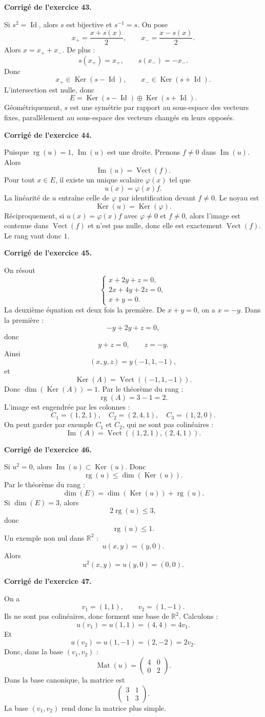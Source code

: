 \documentclass[11pt,a4paper]{article}
\newcommand{\corr}[1]{
    \vspace{0.4cm}
    \noindent\textbf{\textcolor{blue!60!black}{Corrigé de l'exercice #1.}}
    \par\vspace{0.1cm}
}
\newcommand{\Ker}{\operatorname{Ker}}
\newcommand{\Img}{\operatorname{Im}}
\newcommand{\rg}{\operatorname{rg}}
\newcommand{\Mat}{\operatorname{Mat}}
\newcommand{\Vect}{\operatorname{Vect}}
\newcommand{\Id}{\operatorname{Id}}
\begin{document}
\corr{43}
Si $s^2=\Id$, alors $s$ est bijective et $s^{-1}=s$. On pose
\[
x_+=\frac{x+s(x)}2,\qquad x_-=\frac{x-s(x)}2.
\]
Alors $x=x_++x_-$. De plus :
\[
s(x_+)=x_+,
\qquad
s(x_-)=-x_-.
\]
Donc
\[
x_+\in\Ker(s-\Id),
\qquad
x_-\in\Ker(s+\Id).
\]
L'intersection est nulle, donc
\[
E=\Ker(s-\Id)\oplus\Ker(s+\Id).
\]
Géométriquement, $s$ est une symétrie par rapport au sous-espace des vecteurs fixes, parallèlement au sous-espace des vecteurs changés en leurs opposés.

\corr{44}
Puisque $\rg(u)=1$, $\Img(u)$ est une droite. Prenons $f\neq0$ dans $\Img(u)$. Alors
\[
\Img(u)=\Vect(f).
\]
Pour tout $x\in E$, il existe un unique scalaire $\varphi(x)$ tel que
\[
u(x)=\varphi(x)f.
\]
La linéarité de $u$ entraîne celle de $\varphi$ par identification devant $f\neq0$. Le noyau est
\[
\Ker(u)=\Ker(\varphi).
\]
Réciproquement, si $u(x)=\varphi(x)f$ avec $\varphi\neq0$ et $f\neq0$, alors l'image est contenue dans $\Vect(f)$ et n'est pas nulle, donc elle est exactement $\Vect(f)$. Le rang vaut donc $1$.

\corr{45}
On résout
\[
\begin{cases}
x+2y+z=0,\\
2x+4y+2z=0,\\
x+y=0.
\end{cases}
\]
La deuxième équation est deux fois la première. De $x+y=0$, on a $x=-y$. Dans la première :
\[
-y+2y+z=0,
\]
donc
\[
y+z=0,
\qquad z=-y.
\]
Ainsi
\[
(x,y,z)=y(-1,1,-1),
\]
et
\[
\Ker(A)=\Vect((-1,1,-1)).
\]
Donc $\dim(\Ker(A))=1$. Par le théorème du rang :
\[
\rg(A)=3-1=2.
\]
L'image est engendrée par les colonnes :
\[
C_1=(1,2,1),\quad C_2=(2,4,1),\quad C_3=(1,2,0).
\]
On peut garder par exemple $C_1$ et $C_2$, qui ne sont pas colinéaires :
\[
\Img(A)=\Vect((1,2,1),(2,4,1)).
\]

\corr{46}
Si $u^2=0$, alors $\Img(u)\subset\Ker(u)$. Donc
\[
\rg(u)\leq \dim(\Ker(u)).
\]
Par le théorème du rang :
\[
\dim(E)=\dim(\Ker(u))+\rg(u).
\]
Si $\dim(E)=3$, alors
\[
2\rg(u)\leq3,
\]
donc
\[
\rg(u)\leq1.
\]
Un exemple non nul dans $\mathbb{R}^2$ :
\[
u(x,y)=(y,0).
\]
Alors
\[
u^2(x,y)=u(y,0)=(0,0).
\]

\corr{47}
On a
\[
v_1=(1,1),\qquad v_2=(1,-1).
\]
Ils ne sont pas colinéaires, donc forment une base de $\mathbb{R}^2$.
Calculons :
\[
u(v_1)=u(1,1)=(4,4)=4v_1.
\]
Et
\[
u(v_2)=u(1,-1)=(2,-2)=2v_2.
\]
Donc, dans la base $(v_1,v_2)$ :
\[
\Mat(u)=
\begin{pmatrix}
4&0\\
0&2
\end{pmatrix}.
\]
Dans la base canonique, la matrice est
\[
\begin{pmatrix}
3&1\\
1&3
\end{pmatrix}.
\]
La base $(v_1,v_2)$ rend donc la matrice plus simple.
\end{document}
